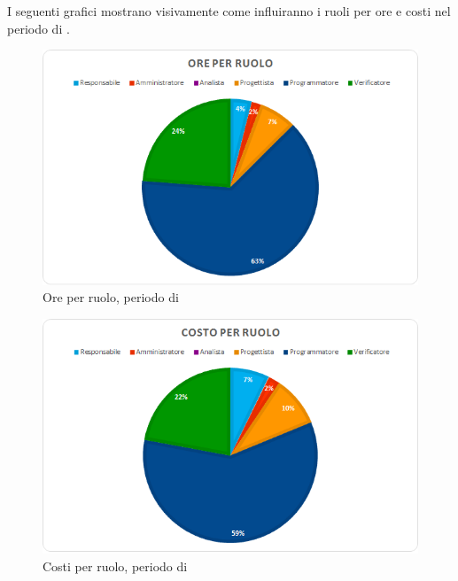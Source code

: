 I seguenti grafici mostrano visivamente come influiranno i ruoli per ore e costi nel periodo di \Cod.
\begin{figure}[H]
	\centering
	\includegraphics[width=14cm]{img_peconomico/C2_OR.png}
	\caption{Ore per ruolo, periodo di \Cod}
\end{figure}
\begin{figure}[H]
	\centering
	\includegraphics[width=14cm]{img_peconomico/C2_CR.png}
	\caption{Costi per ruolo, periodo di \Cod}
\end{figure}

